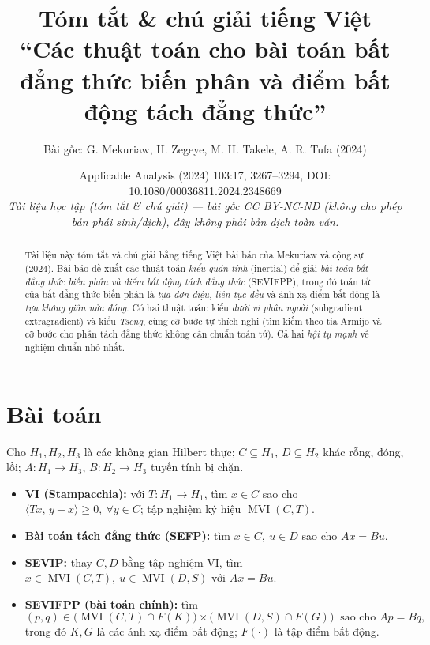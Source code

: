 \documentclass{MyBook}
\title{\vspace{-1.2cm}\bfseries Tóm tắt \& chú giải tiếng Việt\\[4pt]
\large ``Các thuật toán cho bài toán bất đẳng thức biến phân và điểm bất động tách đẳng thức''}
\author{\normalsize Bài gốc: G. Mekuriaw, H. Zegeye, M. H. Takele, A. R. Tufa (2024)}
\date{\small Applicable Analysis (2024) 103:17, 3267--3294, DOI: 10.1080/00036811.2024.2348669\\[2pt]
\textit{Tài liệu học tập (tóm tắt \& chú giải) --- bài gốc CC BY-NC-ND (không cho phép bản phái sinh/dịch), đây không phải bản dịch toàn văn.}}
\theoremstyle{plain}
\theoremstyle{definition}
\newcommand{\inp}[2]{\langle #1,\,#2\rangle}
\newcommand{\Fix}{F}
\DeclareMathOperator{\MVI}{MVI}
\begin{document}
\frontmatter
\maketitle

\begin{abstract}
\noindent Tài liệu này tóm tắt và chú giải bằng tiếng Việt bài báo của Mekuriaw và cộng sự (2024). Bài báo đề xuất các thuật toán \emph{kiểu quán tính} (inertial) để giải \emph{bài toán bất đẳng thức biến phân và điểm bất động tách đẳng thức} (SEVIFPP), trong đó toán tử của bất đẳng thức biến phân là \emph{tựa đơn điệu, liên tục đều} và ánh xạ điểm bất động là \emph{tựa không giãn nửa đóng}. Có hai thuật toán: kiểu \emph{dưới vi phân ngoài} (subgradient extragradient) và kiểu \emph{Tseng}, cùng cỡ bước tự thích nghi (tìm kiếm theo tia Armijo và cỡ bước cho phần tách đẳng thức không cần chuẩn toán tử). Cả hai \emph{hội tụ mạnh} về nghiệm chuẩn nhỏ nhất.
\end{abstract}
\tableofcontents
\mainmatter

\chapter{Bài toán}

Cho $H_1,H_2,H_3$ là các không gian Hilbert thực; $C\subseteq H_1$, $D\subseteq H_2$ khác rỗng, đóng, lồi; $A:H_1\to H_3$, $B:H_2\to H_3$ tuyến tính bị chặn.

\begin{itemize}[leftmargin=1.4em,itemsep=2pt]
\item \textbf{VI (Stampacchia):} với $T:H_1\to H_1$, tìm $x\in C$ sao cho $\inp{Tx}{y-x}\ge 0,\ \forall y\in C$; tập nghiệm ký hiệu $\MVI(C,T)$.
\item \textbf{Bài toán tách đẳng thức (SEFP):} tìm $x\in C,\ u\in D$ sao cho $Ax=Bu$.
\item \textbf{SEVIP:} thay $C,D$ bằng tập nghiệm VI, tìm $x\in\MVI(C,T),\ u\in\MVI(D,S)$ với $Ax=Bu$.
\item \textbf{SEVIFPP (bài toán chính):} tìm
\[
(p,q)\in\bigl(\MVI(C,T)\cap \Fix(K)\bigr)\times\bigl(\MVI(D,S)\cap \Fix(G)\bigr)\ \text{ sao cho } Ap=Bq,
\]
trong đó $K,G$ là các ánh xạ điểm bất động; $\Fix(\cdot)$ là tập điểm bất động.
\end{itemize}
\end{document}
